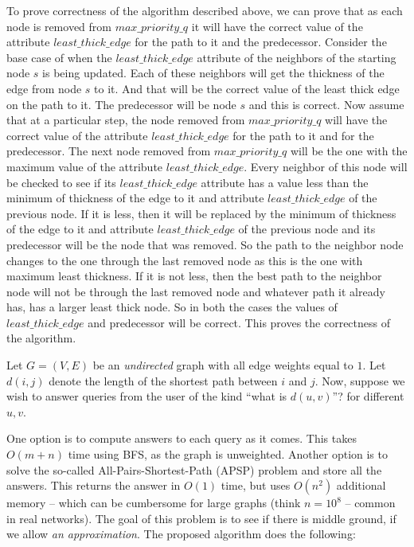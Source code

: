 \documentclass[addpoints]{exam}
\begin{document}
\begin{questions}
To prove correctness of the algorithm described above, we can prove that as each node is removed from $max\_priority\_q$ it will have the correct value of the attribute $least\_thick\_edge$ for the path to it and the predecessor. Consider the base case of when the $least\_thick\_edge$ attribute of the neighbors of the starting node $s$ is being updated. Each of these neighbors will get the thickness of the edge from node $s$ to it. And that will be the correct value of the least thick edge on the path to it. The predecessor will be node $s$ and this is correct. Now assume that at a particular step, the node removed from $max\_priority\_q$ will have the correct value of the attribute $least\_thick\_edge$ for the path to it and for the predecessor. The next node removed from $max\_priority\_q$ will be the one with the maximum value of the attribute $least\_thick\_edge$. Every neighbor of this node will be checked to see if its $least\_thick\_edge$ attribute has a value less than the minimum of thickness of the edge to it and attribute $least\_thick\_edge$ of the previous node. If it is less, then it will be replaced by the minimum of thickness of the edge to it and attribute $least\_thick\_edge$ of the previous node and its predecessor will be the node that was removed. So the path to the neighbor node changes to the one through the last removed node as this is the one with maximum least thickness. If it is not less, then the best path to the neighbor node will not be through the last removed node and whatever path it already has, has a larger least thick node. So in both the cases the values of $least\_thick\_edge$ and predecessor will be correct. This proves the correctness of the algorithm. 

Let $G = (V, E)$ be an {\em undirected} graph with all edge weights equal to $1$. Let $d(i,j)$ denote the length of the shortest path between $i$ and $j$.  Now, suppose we wish to answer queries from the user of the kind ``what is $d(u, v)$''? for different $u, v$.

One option is to compute answers to each query as it comes. This takes $O(m+n)$ time using BFS, as the graph is unweighted.  Another option is to solve the so-called All-Pairs-Shortest-Path (APSP) problem and store all the answers. This returns the answer in $O(1)$ time, but uses $O(n^2)$ additional memory -- which can be cumbersome for large graphs (think $n = 10^8$ -- common in real networks).  The goal of this problem is to see if there is middle ground, if we allow {\em an approximation}. The proposed algorithm does the following:


\end{questions}
\end{document}
